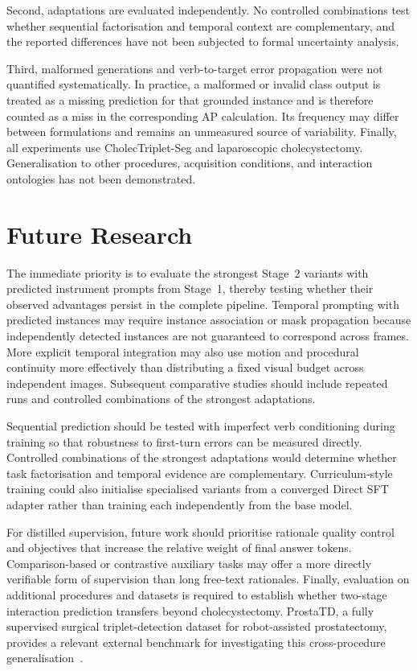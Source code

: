Second, adaptations are evaluated independently. No controlled combinations test whether sequential factorisation and temporal context are complementary, and the reported differences have not been subjected to formal uncertainty analysis.

Third, malformed generations and verb-to-target error propagation were not quantified systematically. In practice, a malformed or invalid class output is treated as a missing prediction for that grounded instance and is therefore counted as a miss in the corresponding AP calculation. Its frequency may differ between formulations and remains an unmeasured source of variability. Finally, all experiments use CholecTriplet-Seg and laparoscopic cholecystectomy. Generalisation to other procedures, acquisition conditions, and interaction ontologies has not been demonstrated.

\section{Future Research}
\label{sec:c5:future-work}

The immediate priority is to evaluate the strongest Stage~2 variants with predicted instrument prompts from Stage~1, thereby testing whether their observed advantages persist in the complete pipeline. Temporal prompting with predicted instances may require instance association or mask propagation because independently detected instances are not guaranteed to correspond across frames. More explicit temporal integration may also use motion and procedural continuity more effectively than distributing a fixed visual budget across independent images. Subsequent comparative studies should include repeated runs and controlled combinations of the strongest adaptations.

Sequential prediction should be tested with imperfect verb conditioning during training so that robustness to first-turn errors can be measured directly. Controlled combinations of the strongest adaptations would determine whether task factorisation and temporal evidence are complementary. Curriculum-style training could also initialise specialised variants from a converged Direct SFT adapter rather than training each independently from the base model.

For distilled supervision, future work should prioritise rationale quality control and objectives that increase the relative weight of final answer tokens. Comparison-based or contrastive auxiliary tasks may offer a more directly verifiable form of supervision than long free-text rationales. Finally, evaluation on additional procedures and datasets is required to establish whether two-stage interaction prediction transfers beyond cholecystectomy. ProstaTD, a fully supervised surgical triplet-detection dataset for robot-assisted prostatectomy, provides a relevant external benchmark for investigating this cross-procedure generalisation~\cite{prostatd}.

